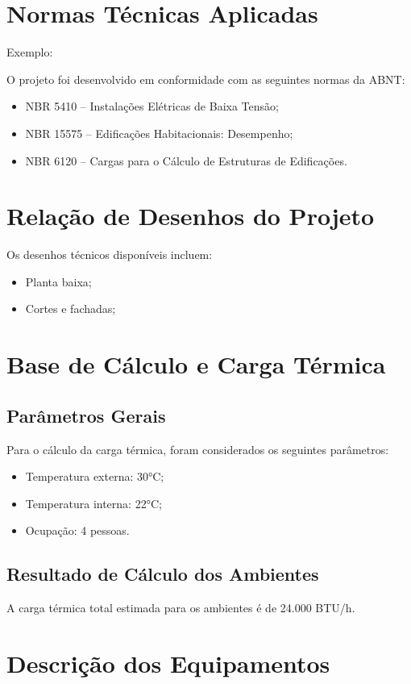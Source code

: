 \section{Normas Técnicas Aplicadas}
Exemplo:

O projeto foi desenvolvido em conformidade com as seguintes normas da ABNT:
\begin{itemize}
    \item NBR 5410 – Instalações Elétricas de Baixa Tensão;
    \item NBR 15575 – Edificações Habitacionais: Desempenho;
    \item NBR 6120 – Cargas para o Cálculo de Estruturas de Edificações.
\end{itemize}

\section{Relação de Desenhos do Projeto}
Os desenhos técnicos disponíveis incluem:
\begin{itemize}
    \item Planta baixa;
    \item Cortes e fachadas;

\end{itemize}

\section{Base de Cálculo e Carga Térmica}
\subsection{Parâmetros Gerais}
Para o cálculo da carga térmica, foram considerados os seguintes parâmetros:
\begin{itemize}
    \item Temperatura externa: 30°C;
    \item Temperatura interna: 22°C;
    \item Ocupação: 4 pessoas.
\end{itemize}

\subsection{Resultado de Cálculo dos Ambientes}
A carga térmica total estimada para os ambientes é de 24.000 BTU/h.

\section{Descrição dos Equipamentos}
